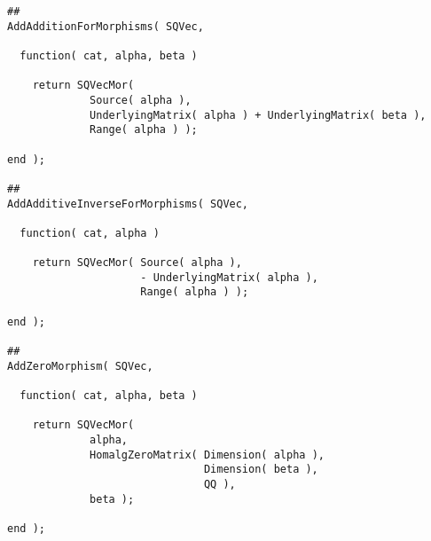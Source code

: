 \begin{small}
\begin{Verbatim}[frame=single]
##
AddAdditionForMorphisms( SQVec,
                         
  function( cat, alpha, beta )
    
    return SQVecMor(
             Source( alpha ),
             UnderlyingMatrix( alpha ) + UnderlyingMatrix( beta ),
             Range( alpha ) );
    
end );

##
AddAdditiveInverseForMorphisms( SQVec,
                                
  function( cat, alpha )
    
    return SQVecMor( Source( alpha ),
                     - UnderlyingMatrix( alpha ),
                     Range( alpha ) );
    
end );

##
AddZeroMorphism( SQVec,
                     
  function( cat, alpha, beta )
    
    return SQVecMor(
             alpha,
             HomalgZeroMatrix( Dimension( alpha ),
                               Dimension( beta ),
                               QQ ),
             beta );
    
end );
\end{Verbatim}
\end{small}
